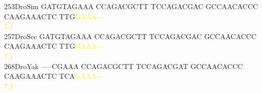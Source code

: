 \documentclass[11pt,twoside,reqno,a4paper]{article}
\begin{document}
{253\hspace*{2\charwidth}DroSim	GATGTAGAAA	CCAGACGCTT	TCCAGACGAC	GCCAACACCC	CAAGAAACTC	TTG\textcolor{yellow}{G}\textcolor{yellow}{A}\textcolor{yellow}{A}\textcolor{yellow}{A}\textcolor{yellow}{-}\textcolor{yellow}{-}\textcolor{yellow}{-}	\\
\hspace*{5\charwidth}\hspace*{7\charwidth}\hspace*{1\charwidth}\hspace*{1\charwidth}\hspace*{1\charwidth}\hspace*{1\charwidth}\hspace*{1\charwidth}\hspace*{53\charwidth}\textcolor{yellow}{7.1}\hspace*{1\charwidth}\\
257\hspace*{2\charwidth}DroSec	GATGTAGAAA	CCAGACGCTT	TCCAGACGAC	GCCAACACCC	CAAGAAACTC	TTG\textcolor{yellow}{G}\textcolor{yellow}{A}\textcolor{yellow}{A}\textcolor{yellow}{A}\textcolor{yellow}{-}\textcolor{yellow}{-}\textcolor{yellow}{-}	\\
\hspace*{5\charwidth}\hspace*{7\charwidth}\hspace*{1\charwidth}\hspace*{1\charwidth}\hspace*{1\charwidth}\hspace*{1\charwidth}\hspace*{1\charwidth}\hspace*{53\charwidth}\textcolor{yellow}{7.1}\hspace*{1\charwidth}\\
268\hspace*{2\charwidth}DroYak	-----CGAAA	CCAGACGCTT	TCCAGACGAT	GCCAACACCC	CAAGAAACTC	TCA\textcolor{yellow}{G}\textcolor{yellow}{A}\textcolor{yellow}{A}\textcolor{yellow}{A}\textcolor{yellow}{-}\textcolor{yellow}{-}\textcolor{yellow}{-}	\\
\hspace*{5\charwidth}\hspace*{7\charwidth}\hspace*{1\charwidth}\hspace*{1\charwidth}\hspace*{1\charwidth}\hspace*{1\charwidth}\hspace*{1\charwidth}\hspace*{53\charwidth}\textcolor{yellow}{7.1}\hspace*{1\charwidth}\\
}
\end{document}
